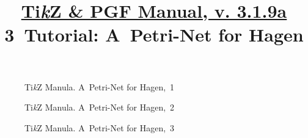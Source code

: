 \documentclass[a4paper,11pt]{article}
\title{
  \href{http://piotrkosoft.net/pub/mirrors/CTAN/graphics/pgf/base/doc/pgfmanual.pdf}{Ti\emph{k}Z \& PGF Manual, v. 3.1.9a} \\
  3~Tutorial: A~Petri-Net for Hagen}
\author{}
\begin{document}





\maketitle %





\newpage





\begin{figure}[ht]

  \centering

  \begin{tikzpicture}



  \end{tikzpicture}

  \caption{Ti\emph{k}Z Manula. A~Petri-Net for Hagen,~1}

\end{figure}





\begin{figure}[ht]

  \centering

  \begin{tikzpicture}



  \end{tikzpicture}

  \caption{Ti\emph{k}Z Manula. A~Petri-Net for Hagen,~2}

\end{figure}





\begin{figure}[ht]

  \centering

  \begin{tikzpicture}



  \end{tikzpicture}

  \caption{Ti\emph{k}Z Manula. A~Petri-Net for Hagen,~3}

\end{figure}
\end{document}
